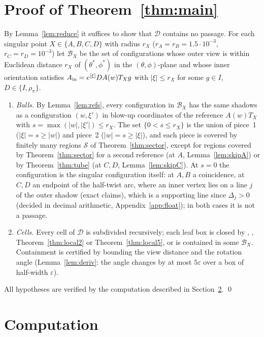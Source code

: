 \documentclass[11pt]{amsart}
\theoremstyle{definition}
\newcommand{\abs}[1]{\lvert #1\rvert}
\begin{document}
\section{Proof of Theorem~\ref{thm:main}}\label{sec:proof}
By Lemma~\ref{lem:reduce} it suffices to show that $\mathcal D$ contains no passage. For each singular point
$X\in\{A,B,C,D\}$ with radius $r_X$ ($r_A=r_B=1.5\cdot10^{-3}$, $r_C=r_D=10^{-3}$) let $\mathcal B_X$ be the set of
configurations whose outer view is within Euclidean distance $r_X$ of $(\theta^*,\phi^*)$ in the $(\theta,\phi)$-plane and
whose inner orientation satisfies $A_{\rm in}=e^{[\xi]}DA(w)T_Xg$ with $\abs\xi\le r_X$ for some $g\in I$,
$D\in\{I,\rho_\pi\}$.
\begin{enumerate}
\item \emph{Balls.} By Lemma~\ref{lem:refs}, every configuration in $\mathcal B_X$ has the same shadows as a configuration
 $(w,\xi')$ in blow-up coordinates of the reference $A(w)T_X$ with $s=\max(\abs w,\abs{\xi'})\le r_X$. The set
 $\{0<s\le r_X\}$ is the union of piece~1 ($\abs\xi=s\ge\abs w$) and piece~2 ($\abs w=s\ge\abs\xi$), and each piece is
 covered by finitely many regions $\mathcal S$ of Theorem~\ref{thm:sector}, except for regions covered by
 Theorem~\ref{thm:sector} for a second reference (at $A$, Lemma~\ref{lem:skipA}) or by Theorem~\ref{thm:tube} (at $C,D$,
 Lemma~\ref{lem:skipC}). At $s=0$ the configuration is the singular configuration itself: at $A,B$ a coincidence, at
 $C,D$ an endpoint of the half-twist arc, where an inner vertex lies on a line $j$ of the outer shadow (exact claims),
 which is a supporting line since $\Delta_j>0$ (decided in decimal arithmetic, Appendix~\ref{app:float}); in both
 cases it is not a passage.
\item \emph{Cells.} Every cell of $\mathcal D$ is subdivided recursively; each leaf box is closed by
 \cite[Theorem 17]{SY25}, \cite[Theorem 36]{SY25}, Theorem~\ref{thm:local2} or Theorem~\ref{thm:local5}, or is contained in
 some $\mathcal B_X$. Containment is certified by bounding the view distance and the rotation angle
 (Lemma~\ref{lem:deriv}: the angle changes by at most $5\varepsilon$ over a box of half-width $\varepsilon$).
\end{enumerate}
All hypotheses are verified by the computation described in Section~\ref{sec:comp}. \qed

\section{Computation}\label{sec:comp}
\end{document}
